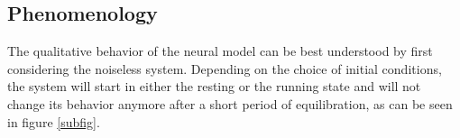 \documentclass[12pt,a4paper]{article}
\begin{document}
\subsection{Phenomenology}
The qualitative behavior of the neural model can be best understood by first considering the noiseless system. Depending on the choice of initial conditions, the system will start in either the resting or the running state and will not change its behavior anymore after a short period of equilibration, as can be seen in figure \ref{subfig}. 
\begin{figure}[H]

\end{figure}
\end{document}
